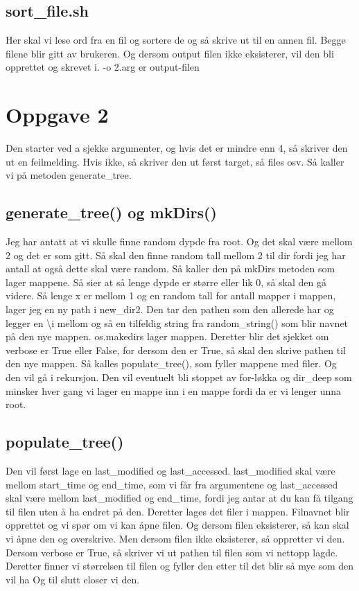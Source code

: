 \documentclass{article}
\begin{document}
\subsection{sort\_file.sh}
\label{sec:1.4}
Her skal vi lese ord fra en fil og sortere de og så skrive ut til
en annen fil. Begge filene blir gitt av brukeren. Og dersom output
filen ikke eksisterer, vil den bli opprettet og skrevet i.
-o 2.arg er output-filen

\section{Oppgave 2}
\label{sec:Oppg.2}

Den starter ved a sjekke argumenter, og hvis det er mindre enn 4, så 
skriver den ut en feilmelding. Hvis ikke, så skriver den ut først 
target, så files osv. Så kaller vi på metoden generate\_tree.

\subsection{generate\_tree() og mkDirs()}
Jeg har antatt at vi skulle finne random dypde fra root. Og det skal
være mellom 2 og det er som gitt. Så skal den finne random tall mellom 2 
til dir fordi jeg har antall at også dette skal være random. Så kaller den
på mkDirs metoden som lager mappene.
Så sier at så lenge dypde er større eller lik 0, så skal den gå videre.
Så lenge x er mellom 1 og en random tall for antall mapper i mappen,
lager jeg en ny path i new\_dir2. Den tar den pathen som den allerede har og
legger en \textbackslash i mellom og så en tilfeldig string fra random\_string() som 
blir navnet på den nye mappen. os.makedirs lager mappen. Deretter blir 
det sjekket om verbose er True eller False, for dersom den er True, så skal 
den skrive pathen til den nye mappen. Så kalles populate\_tree(), som fyller 
mappene med filer. Og den vil gå i rekursjon. Den vil eventuelt bli stoppet
av for-løkka og dir\_deep som minsker hver gang vi lager en mappe inn i en
mappe fordi da er vi lenger unna root.

\subsection{populate\_tree()}
Den vil først lage en last\_modified og last\_accessed. last\_modified skal
være mellom start\_time og end\_time, som vi får fra argumentene og 
last\_accessed skal være mellom last\_modified og end\_time, fordi jeg
antar at du kan få tilgang til filen uten å ha endret på den. 
Deretter lages det filer i mappen. Filnavnet blir opprettet og vi spør 
om vi kan åpne filen. Og dersom filen eksisterer, så kan skal vi åpne
den og overskrive. Men dersom filen ikke eksisterer, så oppretter vi den. 
Dersom verbose er True, så skriver vi ut pathen til filen som vi nettopp
lagde. Deretter finner vi størrelsen til filen og fyller den etter til
det blir så mye som den vil ha Og til slutt closer vi den.
\end{document}
